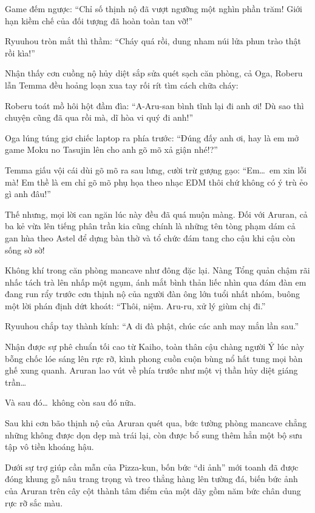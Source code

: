\documentclass[../main.tex]{subfiles}
\begin{document}
Game đếm ngược: ``Chỉ số thịnh nộ đã vượt ngưỡng một nghìn phần trăm! Giới hạn kiềm chế của đối tượng đã hoàn toàn tan vỡ!''


Ryuuhou tròn mắt thì thầm: ``Cháy quá rồi, dung nham núi lửa phun trào thật rồi kìa!''

Nhận thấy cơn cuồng nộ hủy diệt sắp sửa quét sạch căn phòng, cả Oga, Roberu lẫn Temma đều hoảng loạn xua tay rối rít tìm cách chữa cháy:

Roberu toát mồ hôi hột đầm đìa: ``A-Aru-san bình tĩnh lại đi anh ơi! Dù sao thì chuyện cũng đã qua rồi mà, dĩ hòa vi quý đi anh!''

Oga lúng túng giơ chiếc laptop ra phía trước: ``Đúng đấy anh ơi, hay là em mở game Moku no Tasujin lên cho anh gõ mõ xả giận nhé!?''

Temma giấu vội cái dùi gõ mõ ra sau lưng, cười trừ gượng gạo: ``Em\dots\ em xin lỗi mà! Em thề là em chỉ gõ mõ phụ họa theo nhạc EDM thôi chứ không có ý trù ẻo gì anh đâu!''

Thế nhưng, mọi lời can ngăn lúc này đều đã quá muộn màng. Đối với Aruran, cả ba kẻ vừa lên tiếng phân trần kia cũng chính là những tên tòng phạm dám cả gan hùa theo Astel để dựng bàn thờ và tổ chức đám tang cho cậu khi cậu còn sống sờ sờ!

Không khí trong căn phòng mancave như đông đặc lại. Nàng Tổng quản chậm rãi nhấc tách trà lên nhấp một ngụm, ánh mắt bình thản liếc nhìn qua đám đàn em đang run rẩy trước cơn thịnh nộ của người đàn ông lớn tuổi nhất nhóm, buông một lời phán định dứt khoát: ``Thôi, niệm. Aru-ru, xử lý giùm chị đi.''

Ryuuhou chắp tay thành kính: ``A di đà phật, chúc các anh may mắn lần sau.''

Nhận được sự phê chuẩn tối cao từ Kaiho, toàn thân cậu chàng người Ý lúc này bỗng chốc lóe sáng lên rực rỡ, kình phong cuồn cuộn bùng nổ hất tung mọi bàn ghế xung quanh. Aruran lao vút về phía trước như một vị thần hủy diệt giáng trần\dots

Và sau đó\dots\ không còn sau đó nữa.

\omk

Sau khi cơn bão thịnh nộ của Aruran quét qua, bức tường phòng mancave chẳng những không được dọn dẹp mà trái lại, còn được bổ sung thêm hẳn một bộ sưu tập vô tiền khoáng hậu.

Dưới sự trợ giúp cần mẫn của Pizza-kun, bốn bức ``di ảnh'' mới toanh đã được đóng khung gỗ nâu trang trọng và treo thẳng hàng lên tường đá, biến bức ảnh của Aruran trên cây cột thành tâm điểm của một dãy gồm năm bức chân dung rực rỡ sắc màu.
\end{document}
